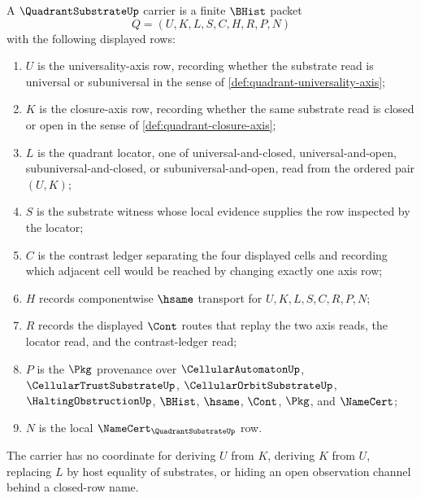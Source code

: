 \begin{definition}
\label{def:quadrant-substrate-namecert-carrier}
A $\QuadrantSubstrateUp$ carrier is a finite $\BHist$ packet
$$
Q=(U,K,L,S,C,H,R,P,N)
$$
with the following displayed rows:
\begin{enumerate}
\item $U$ is the universality-axis row, recording whether the substrate read is universal or subuniversal in the sense of \autoref{def:quadrant-universality-axis};
\item $K$ is the closure-axis row, recording whether the same substrate read is closed or open in the sense of \autoref{def:quadrant-closure-axis};
\item $L$ is the quadrant locator, one of universal-and-closed, universal-and-open, subuniversal-and-closed, or subuniversal-and-open, read from the ordered pair $(U,K)$;
\item $S$ is the substrate witness whose local evidence supplies the row inspected by the locator;
\item $C$ is the contrast ledger separating the four displayed cells and recording which adjacent cell would be reached by changing exactly one axis row;
\item $H$ records componentwise $\hsame$ transport for $U,K,L,S,C,R,P,N$;
\item $R$ records the displayed $\Cont$ routes that replay the two axis reads, the locator read, and the contrast-ledger read;
\item $P$ is the $\Pkg$ provenance over $\CellularAutomatonUp$, $\CellularTrustSubstrateUp$, $\CellularOrbitSubstrateUp$, $\HaltingObstructionUp$, $\BHist$, $\hsame$, $\Cont$, $\Pkg$, and $\NameCert$;
\item $N$ is the local $\NameCert_{\QuadrantSubstrateUp}$ row.
\end{enumerate}
The carrier has no coordinate for deriving $U$ from $K$, deriving $K$ from $U$, replacing $L$ by host equality of substrates, or hiding an open observation channel behind a closed-row name.
\end{definition}

